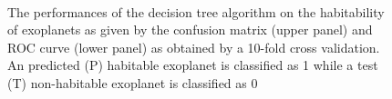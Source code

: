 \documentclass[
12pt, %
a4paper, %
oneside, %
headinclude,footinclude, %
BCOR5mm, %
]{scrartcl}
\begin{document}
\begin{figure}[htp]
  \centering
{}\\
\caption{The performances of the decision tree algorithm on the habitability of exoplanets as given by the confusion matrix (upper panel) and ROC curve (lower panel) as obtained by a 10-fold cross validation. An predicted (P) habitable exoplanet is classified as 1 while a test (T) non-habitable exoplanet is classified as 0}
\label{Decision_tree_performances}
\end{figure}
\end{document}
